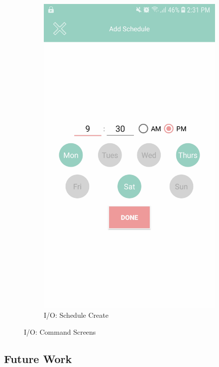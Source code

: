 \documentclass[12pt]{paper}
\begin{document}
\begin{figure}[H]
\begin{subfigure}[b]{.35\linewidth}
				\includegraphics[width=\linewidth]{img/output_schedule.jpg}
				\caption{I/O: Schedule Create}
			\end{subfigure}
			\caption{I/O: Command Screens}
			\label{output:command}
		\end{figure}
		
		\subsection{Future Work}
\end{document}

